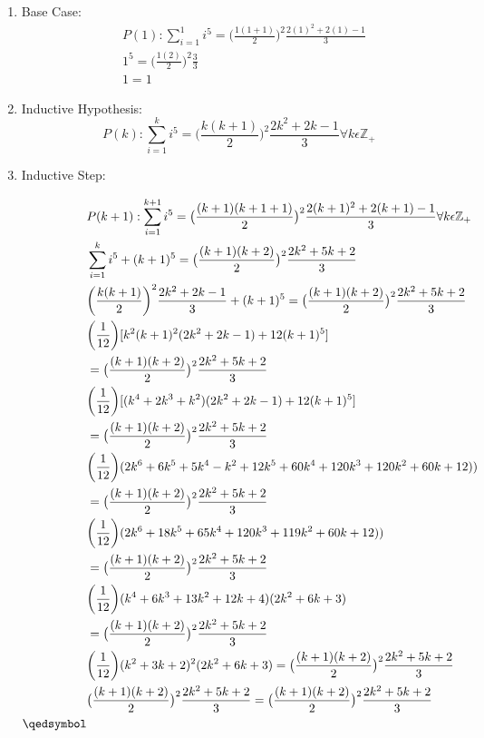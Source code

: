 \documentclass[12pt]{article}
\begin{document}
\begin{enumerate}
\item Base Case:\\
\begin{align}
&P(1):\sum\limits_{i = 1}^{1} i^5 = \big(\frac{1(1 + 1)}{2}\big)^2\frac{2(1)^2+2(1)-1}{3}\\
&1^5 = \big(\frac{1(2)}{2}\big)^2\frac{3}{3}\\
&1 = 1
\end{align}
\item Inductive Hypothesis:
\[P(k):\sum\limits_{i = 1}^{k} i^5 = \big(\frac{k(k + 1)}{2}\big)^2\frac{2k^2+2k-1}{3} \forall k \epsilon \mathbb{Z}_+  \]
\item Inductive Step:

\begin{align}
&P(k+1):\sum\limits_{i = 1}^{k+1} i^5 = \big(\frac{(k+1)(k + 1 + 1)}{2}\big)^2\frac{2(k+1)^2+2(k+1)-1}{3} \forall k \epsilon \mathbb{Z}_+ \\
&\sum\limits_{i = 1}^{k} i^5 + (k + 1)^5 = \big(\frac{(k+1)(k + 2)}{2}\big)^2\frac{2k^2+5k+2}{3}\\
&\bigg(\frac{k(k + 1)}{2}\bigg)^2\frac{2k^2+2k-1}{3} + (k + 1)^5 = \big(\frac{(k+1)(k + 2)}{2}\big)^2\frac{2k^2+5k+2}{3}\\
&\bigg(\frac{1}{12}\bigg)[k^2(k+1)^2(2k^2+2k-1)+12(k+1)^5] \\&= \big(\frac{(k+1)(k + 2)}{2}\big)^2\frac{2k^2+5k+2}{3}\\
&\bigg(\frac{1}{12}\bigg)[(k^4+2k^3+k^2)(2k^2+2k-1)+12(k+1)^5]\\&= \big(\frac{(k+1)(k + 2)}{2}\big)^2\frac{2k^2+5k+2}{3}\\
&\bigg(\frac{1}{12}\bigg)(2k^6+6k^5+5k^4-k^2+12k^5+60k^4+120k^3+120k^2+60k+12))\\&= \big(\frac{(k+1)(k + 2)}{2}\big)^2\frac{2k^2+5k+2}{3}\\
&\bigg(\frac{1}{12}\bigg)(2k^6+18k^5+65k^4+120k^3+119k^2+60k+12))\\&= \big(\frac{(k+1)(k + 2)}{2}\big)^2\frac{2k^2+5k+2}{3}\\
&\bigg(\frac{1}{12}\bigg)(k^4+6k^3+13k^2+12k+4)(2k^2+6k+3)\\&= \big(\frac{(k+1)(k + 2)}{2}\big)^2\frac{2k^2+5k+2}{3}\\
&\bigg(\frac{1}{12}\bigg)(k^2+3k+2)^2(2k^2+6k+3)= \big(\frac{(k+1)(k + 2)}{2}\big)^2\frac{2k^2+5k+2}{3}\\
&\big(\frac{(k+1)(k + 2)}{2}\big)^2\frac{2k^2+5k+2}{3}= \big(\frac{(k+1)(k + 2)}{2}\big)^2\frac{2k^2+5k+2}{3}\\\qedsymbol
\end{align}
\end{enumerate}
\end{document}
